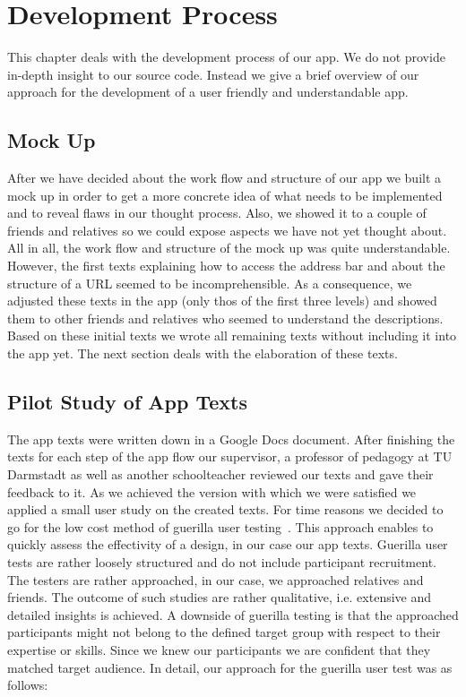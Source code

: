 
\section{Development Process}
This chapter deals with the development process of our app.
We do not provide in-depth insight to our source code. 
Instead we give a brief overview of our approach for the development of a user friendly and understandable app.
\subsection{Mock Up}
After we have decided about the work flow and structure of our app we built a mock up in order to get a more concrete idea of what needs to be implemented and to reveal flaws in our thought process.
Also, we showed it to a couple of friends and relatives so we could expose aspects we have not yet thought about.
All in all, the work flow and structure of the mock up was quite understandable.
However, the first texts explaining how to access the address bar and about the structure of a URL seemed to be incomprehensible.
As a consequence, we adjusted these texts in the app (only thos of the first three levels) and showed them to other friends and relatives who seemed to understand the descriptions.
Based on these initial texts we wrote all remaining texts without including it into the app yet.
The next section deals with the elaboration of these texts.
\subsection{Pilot Study of App Texts}
The app texts were written down in a Google Docs document.
After finishing the texts for each step of the app flow our supervisor, a professor of pedagogy at TU Darmstadt as well as another schoolteacher reviewed our texts and gave their feedback to it.
As we achieved the version with which we were satisfied we applied a small user study on the created texts. 
For time reasons we decided to go for the low cost method of guerilla user testing~\cite{guerillagovuk, guerillauxbooth}.
This approach enables to quickly assess the effectivity of a design, in our case our app texts.
Guerilla user tests are rather loosely structured and do not include participant recruitment.
The testers are rather approached, in our case, we approached relatives and friends. 
The outcome of such studies are rather qualitative, i.e. extensive and detailed insights is achieved.
A downside of guerilla testing is that the approached participants might not belong to the defined target group with respect to their expertise or skills. 
Since we knew our participants we are confident that they matched target audience. 
In detail, our approach for the guerilla user test was as follows:

